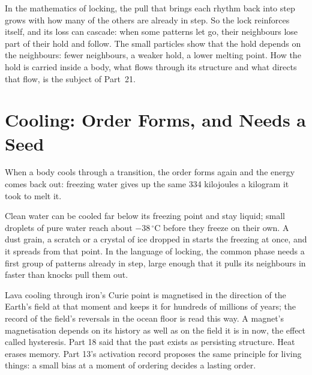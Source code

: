 \documentclass[11pt,a4paper]{article}
\begin{document}
 In the mathematics of locking, the pull that brings each rhythm back into step grows with how many of the others are already in step. So the lock reinforces itself, and its loss can cascade: when some patterns let go, their neighbours lose part of their hold and follow.  The small particles show that the hold depends on the neighbours: fewer neighbours, a weaker hold, a lower melting point. How the hold is carried inside a body, what flows through its structure and what directs that flow, is the subject of Part~21.

\section{Cooling: Order Forms, and Needs a Seed}
\label{sec:cooling}

When a body cools through a transition, the order forms again and the energy comes back out: freezing water gives up the same 334 kilojoules a kilogram it took to melt it. 

 Clean water can be cooled far below its freezing point and stay liquid; small droplets of pure water reach about $-38$\,$^\circ$C before they freeze on their own. A dust grain, a scratch or a crystal of ice dropped in starts the freezing at once, and it spreads from that point. In the language of locking, the common phase needs a first group of patterns already in step, large enough that it pulls its neighbours in faster than knocks pull them out. 

 Lava cooling through iron's Curie point is magnetised in the direction of the Earth's field at that moment and keeps it for hundreds of millions of years; the record of the field's reversals in the ocean floor is read this way. A magnet's magnetisation depends on its history as well as on the field it is in now, the effect called hysteresis. Part 18 said that the past exists as persisting structure.  Heat erases memory. Part 13's activation record proposes the same principle for living things: a small bias at a moment of ordering decides a lasting order.
\end{document}

